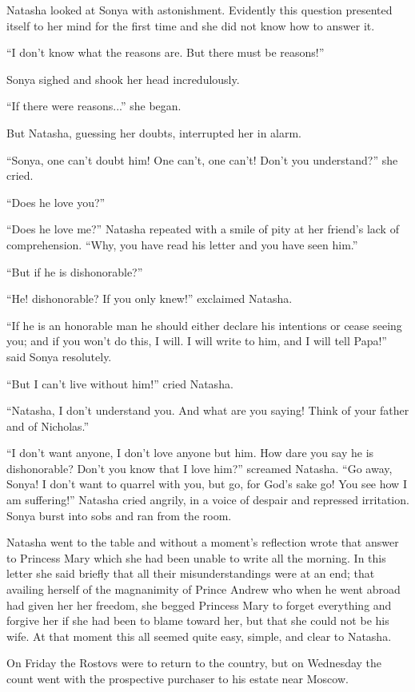 Natasha looked at Sonya with astonishment. Evidently this
question presented itself to her mind for the first time and she
did not know how to answer it.

``I don't know what the reasons are. But there must be reasons!''

Sonya sighed and shook her head incredulously.

``If there were reasons...'' she began.

But Natasha, guessing her doubts, interrupted her in alarm.

``Sonya, one can't doubt him! One can't, one can't! Don't you
understand?'' she cried.

``Does he love you?''

``Does he love me?'' Natasha repeated with a smile of pity at her
friend's lack of comprehension. ``Why, you have read his letter
and you have seen him.''

``But if he is dishonorable?''

``He! dishonorable? If you only knew!'' exclaimed Natasha.

``If he is an honorable man he should either declare his
intentions or cease seeing you; and if you won't do this, I
will. I will write to him, and I will tell Papa!'' said Sonya
resolutely.

``But I can't live without him!'' cried Natasha.

``Natasha, I don't understand you. And what are you saying! Think
of your father and of Nicholas.''

``I don't want anyone, I don't love anyone but him. How dare you
say he is dishonorable? Don't you know that I love him?''
screamed Natasha. ``Go away, Sonya! I don't want to quarrel with
you, but go, for God's sake go! You see how I am suffering!''
Natasha cried angrily, in a voice of despair and repressed
irritation. Sonya burst into sobs and ran from the room.

Natasha went to the table and without a moment's reflection wrote
that answer to Princess Mary which she had been unable to write
all the morning. In this letter she said briefly that all their
misunderstandings were at an end; that availing herself of the
magnanimity of Prince Andrew who when he went abroad had given
her her freedom, she begged Princess Mary to forget everything
and forgive her if she had been to blame toward her, but that she
could not be his wife.  At that moment this all seemed quite
easy, simple, and clear to Natasha.

On Friday the Rostovs were to return to the country, but on
Wednesday the count went with the prospective purchaser to his
estate near Moscow.

